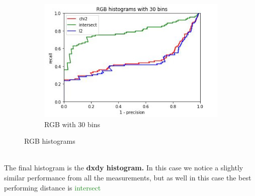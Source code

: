 \documentclass[
	12pt, %
]{fphw}
\begin{document}
\begin{figure}[h!]
\begin{subfigure}[b]{0.3\textwidth}
         \includegraphics[width=\textwidth]{img/plots/RGB_30.JPG}
         \caption{RGB with 30 bins}
         \label{fig:five over x}
     \end{subfigure}
        \caption{RGB histograms}
        \label{fig:three graphs}
\end{figure} \\
The final histogram is the \textbf{dxdy histogram.} In this case we notice a slightly similar performance from all the measurements, but as well in this case the best performing distance is \textcolor{ForestGreen}{intersect} 
\end{document}

